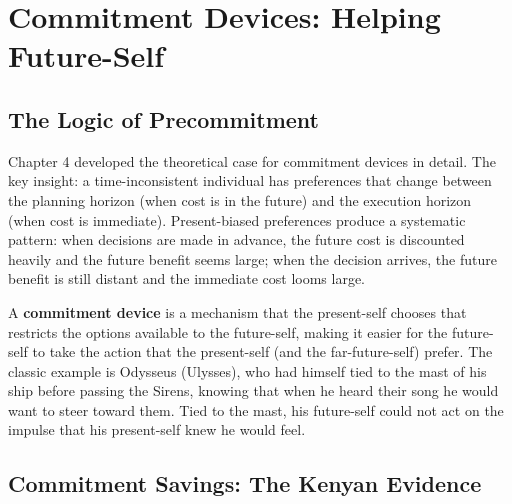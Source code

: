 \documentclass[12pt, letterpaper]{article}
\begin{document}
\medskip


\section{Commitment Devices: Helping Future-Self}



\subsection{The Logic of Precommitment}


Chapter 4 developed the theoretical case for commitment devices in detail. The key insight: a time-inconsistent individual has preferences that change between the planning horizon (when cost is in the future) and the execution horizon (when cost is immediate). Present-biased preferences produce a systematic pattern: when decisions are made in advance, the future cost is discounted heavily and the future benefit seems large; when the decision arrives, the future benefit is still distant and the immediate cost looms large.

A \textbf{commitment device} is a mechanism that the present-self chooses that restricts the options available to the future-self, making it easier for the future-self to take the action that the present-self (and the far-future-self) prefer. The classic example is Odysseus (Ulysses), who had himself tied to the mast of his ship before passing the Sirens, knowing that when he heard their song he would want to steer toward them. Tied to the mast, his future-self could not act on the impulse that his present-self knew he would feel.


\subsection{Commitment Savings: The Kenyan Evidence}
\end{document}
